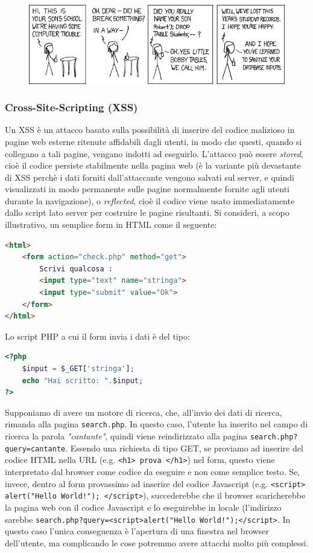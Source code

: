 \begin{figure}[htbp]
	\centering
	\includegraphics[scale = 0.5]{images/exploits_of_a_mom}
	\label{img:xkcd}
\end{figure}


\subsubsection{Cross-Site-Scripting (XSS)}
Un XSS è un attacco basato sulla possibilità di inserire del codice malizioso in pagine web esterne ritenute affidabili dagli utenti, in modo che questi, quando si collegano a tali pagine, vengano indotti ad eseguirlo. L'attacco può essere \textit{stored}, cioè il codice persiste stabilmente nella pagina web (è la variante più devastante di XSS perchè i dati forniti dall'attaccante vengono salvati sul server, e quindi visualizzati in modo permanente sulle pagine normalmente fornite agli utenti durante la navigazione), o \textit{reflected}, cioè il codice viene usato immediatamente dallo script lato server per costruire le pagine risultanti. Si consideri, a scopo illustrativo, un semplice form in HTML come il seguente:
\begin{lstlisting}[language=html]
<html>
	<form action="check.php" method="get">
		Scrivi qualcosa :
		<input type="text" name="stringa">
		<input type="submit" value="Ok">
	</form>
</html>
\end{lstlisting}
Lo script PHP a cui il form invia i dati è del tipo:
\begin{lstlisting}[language=php]
<?php
	$input = $_GET['stringa'];
	echo "Hai scritto: ".$input;
?>
\end{lstlisting}
Supponiamo di avere un motore di ricerca, che, all’invio dei dati di ricerca, rimanda alla pagina \texttt{search.php}. In questo caso, l’utente ha inserito nel campo di ricerca la parola \textit{"cantante"}, quindi viene reindirizzato alla pagina \texttt{search.php?query=cantante}. Essendo una richiesta di tipo GET, se proviamo ad inserire del codice HTML nella URL (e.g. \texttt{<h1> prova </h1>}) nel form, questo viene interpretato dal browser come codice da eseguire e non come semplice testo. Se, invece, dentro al form provassimo ad inserire del codice Javascript (e.g. \texttt{<script> alert("Hello World!"); </script>}), succederebbe che il browser scaricherebbe la pagina web con il codice Javascript e lo eseguirebbe in locale (l'indirizzo sarebbe \texttt{search.php?query=<script>alert("Hello World!");</script>}. In questo caso l'unica conseguenza è l'apertura di una finestra nel browser dell'utente, ma complicando le cose potremmo avere attacchi molto più complessi.\\


